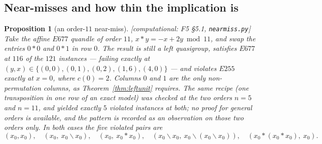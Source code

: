 \documentclass[11pt]{article}
\theoremstyle{plain}
\newtheorem{proposition}[theorem]{Proposition}
\theoremstyle{definition}
\theoremstyle{remark}
\numberwithin{equation}{section}
\newcommand{\op}{\mathbin{*}}
\newcommand{\statusbox}[1]{{\small\sloppy\textsf{[#1]}}}
\newcommand{\COMP}[1]{\statusbox{computational: #1}}
\begin{document}
\subsection{Near-misses and how thin the implication is}\label{sec:nearmiss}

\begin{proposition}[an order-$11$ near-miss]\label{prop:nearmiss}
\COMP{F5 \S5.1, \texttt{nearmiss.py}}
Take the affine $E677$ quandle of order $11$, $x\op y = -x+2y \bmod 11$, and swap the entries
$0\op0$ and $0\op1$ in row $0$. The result is still a left quasigroup, satisfies $E677$ at
$116$ of the $121$ instances --- failing exactly at
$(y,x)\in\{(0,0),(0,1),(0,2),(1,6),(4,0)\}$ --- and violates $E255$ exactly at $x=0$, where
$c(0)=2$. Columns $0$ and $1$ are the only non-permutation columns, as
Theorem~\ref{thm:leftunit} requires. The same recipe (one transposition in one row of an exact
model) was checked at the two orders $n=5$ and $n=11$, and yielded exactly $5$ violated
instances at both; \emph{no proof for general orders is available, and the pattern is
recorded as an observation on those two orders only.} In both cases the five violated pairs
are
\[
  (x_0,x_0),\quad (x_0,\ x_0\backslash x_0),\quad (x_0,\ x_0\op x_0),\quad
  (x_0\backslash x_0,\ x_0\backslash(x_0\backslash x_0)),\quad (x_0\op(x_0\op x_0),\ x_0).
\]
\end{proposition}
\end{document}

